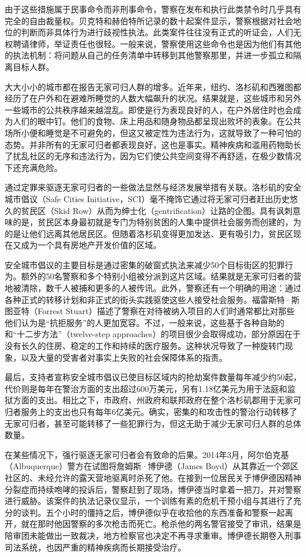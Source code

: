 \documentclass[fontset=fandol, a4paper, 12pt, openright]{ctexbook}
\begin{document}
由于这些措施属于民事命令而非刑事命令，警察在发布和执行此类禁令时几乎具有完全的自由裁量权。贝克特和赫伯特所记录的数十起案件显示，警察根据对社会地位的判断而非具体行为进行歧视性执法。此类案件往往没有正式的听证会，人们无权聘请律师，举证责任也很轻。一般来说，警察使用这些命令也是因为他们有其他的执法机制：将问题从自己的任务清单中转移到其他警察那里，并进一步孤立和隔离目标人群。

大大小小的城市都在报告无家可归人群的增多。近年来，纽约、洛杉矶和西雅图都经历了在户外和在避难所睡觉的人数大幅飙升的状况。结果就是，这些城市和另外一些城市的公共秩序越来越混乱。即使是行为表现良好的人，在户外居住时也会成为人们的眼中钉。他们的食物、床上用品和随身物品都呈现出败坏的表象。在公共场所小便和睡觉是不可避免的，但这又被定性为违法行为，这就导致了一种可怕的态势。并非所有的无家可归者都表现良好，这也是事实。精神疾病和滥用药物助长了扰乱社区的无序和违法行为，因为它们使公共空间变得不再舒适，在极少数情况下还充满危险。

通过定罪来驱逐无家可归者的一些做法显然与经济发展举措有关联。洛杉矶的安全城市倡议（Safe Cities Initiative，SCI）毫不掩饰它通过将无家可归者赶出历史悠久的贫民区（Skid Row）从而为绅士化（gentrification）让路的企图。具有讽刺意味的是，贫民区本身最初就是专门为特别贫困的人集中提供社会服务而创建的，为的是让他们远离其他居民区。但随着洛杉矶变得更加发达、更有吸引力，贫民区现在又成为一个具有房地产开发价值的区域。

安全城市倡议的主要目标是通过密集的破窗式执法来减少50个目标街区的犯罪行为。额外的50名警察和多个特别小组被分派到这片区域。结果就是无家可归者的营地被清除，数千人被捕和更多的人被传讯。此外，警察还有一个明确的用途：通过各种正式的转移计划和非正式的街头实践驱使这些人接受社会服务。福雷斯特·斯图亚特（Forrest Stuart）描述了警察在对待被纳入项目的人们时通常都比对那些他们认为是“抗拒服务”的人更加宽容。不过，一般来说，这些基于各种自助的和“十二步方法”（twelve-step approaches）的项目很少会取得成功，部分原因在于没有长久的住房、稳定的工作和持续的医疗服务。这种状况导致了一种旋转门现象，以及大量的受害者对事实上失败的社会保障体系的指责。

最后，支持者宣称安全城市倡议已使目标区域内的抢劫案件数量每年减少约50起，代价则是每年在警治方面的支出超过600万美元，另有1.18亿美元为用于法庭和监狱方面的支出。相比之下，市政府、州政府和联邦政府在整个洛杉矶郡用于无家可归者服务上的支出也只有每年6亿美元。确实，密集的和攻击性的警治行动转移了无家可归者，甚至可能转移了一些犯罪行为，但这无助于减少无家可归人群的总体数量。

在某些情况下，强行驱逐无家可归者会有致命的后果。2014年3月，阿尔伯克基（Albuquerque）警方在试图将詹姆斯·博伊德（James Boyd）从其靠近一个郊区社区的、未经允许的露天营地驱离时杀死了他。在接到一位居民关于博伊德因精神分裂症而持续咆哮的投诉后，警察赶到了现场，博伊德当时拿着一把刀，并对警察进行威胁。该案件的执法记录仪显示，一个训练有素的危机干预小组与其进行了充分的谈判。五个小时的僵持之后，博伊德似乎在收拾他的东西准备和警察一起离开，就在那时他因警察的多次枪击而死亡。枪杀他的两名警官接受了审讯，结果是陪审团未能做出一致裁决，地方检察官也决定不再寻求重审。博伊德长期卷入刑事司法系统，也因严重的精神疾病而长期接受治疗。
\end{document}
